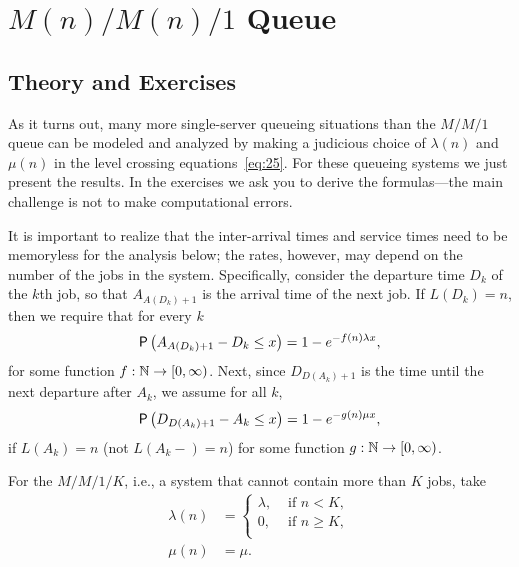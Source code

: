 \section
{$M(n)/M(n)/1$ Queue}
\label{sec:mnmn1}

\subsection*{Theory and Exercises}


As it turns out, many more single-server queueing situations than the $M/M/1$ queue can be modeled and analyzed by making a judicious choice of $\lambda(n)$ and $\mu(n)$ in the level crossing equations~\eqref{eq:25}.
For these queueing systems we just present the results.
In the exercises we ask you to derive the formulas---the main challenge is not to make computational errors.

It is important to realize that the inter-arrival times and service times need to be memoryless for the analysis below; the rates, however, may  depend on the number of the jobs in the system. Specifically, consider the departure time $D_k$ of the $k$th job, so that $A_{A(D_k)+1}$ is the arrival time of the next job. If $L(D_k)=n$, then we require that for every $k$ 
\begin{equation*}
  \P{A_{A(D_k)+1} - D_k \leq x} = 1-e^{-f(n) \lambda x},
\end{equation*}
for some function $f:\mathbb{N}\to [0,\infty)$. Next, since $D_{D(A_k)+1}$ is the time until the next departure after $A_k$, we assume for all $k$,
\begin{equation*}
  \P{D_{D(A_k)+1} - A_k \leq x} = 1-e^{-g(n) \mu x},
\end{equation*}
if $L(A_k)=n$ (not $L(A_k-)=n$) for some function $g:\mathbb{N} \to [0,\infty)$. 


For the $M/M/1/K$, i.e., a system that cannot contain more than $K$ jobs, take
  \begin{align*}
    \lambda(n) &= 
  \begin{cases}
    \lambda, &\text{ if } n < K, \\
    0, &\text{ if } n \geq K, \\
  \end{cases} \\
\mu(n) &= \mu.
  \end{align*}

